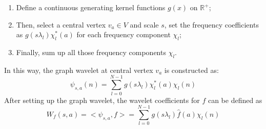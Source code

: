 \begin{enumerate}
\item Define a continuous generating kernel functions $g(x)$ on $\mathbb{R}^+$;
\item Then, select a central vertex $v_a \in {V}$ and scale $s$, set the frequency coefficients as $g(s\lambda_l)\chi^*_l(a)$ for each frequency component $\chi_l$;
\item Finally, sum up all those frequency components $\chi_l$.
\end{enumerate}
In this way, the graph wavelet at central vertex $v_a$ is constructed as:
\begin{equation}
\label{eq:graphwaveletdefinition}
\psi_{s,a}(n) = \sum\limits_{l=0}^{N-1}g(s\lambda_l)\chi_l^*(a)\chi_l(n)
\end{equation}
After setting up the graph wavelet, the wavelet coefficients for $f$ can be defined as
\begin{equation}
\label{eq:graph_graphwavelet}
W_f(s,a)=<\psi_{s,a}, f>=\sum\limits_{l=0}^{N-1}g(s\lambda_l)\hat{f}(a)\chi_l(n)
\end{equation}

